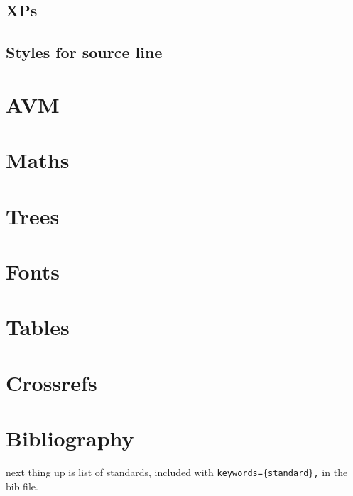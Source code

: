 \documentclass[output=book
  ,colorlinks
  ,showindex
    ,tblseight
  ]{langscibook}
\begin{document}
\subsection{XPs}




\subsection{Styles for source line}




\section{AVM}


\section{Maths}


\section{Trees}


\section{Fonts}



\section{Tables}\label{sec:tables}



\section{Crossrefs}


\section{Bibliography}


\printbibliography[notkeyword={techreport},notkeyword={website},title={References}]

next thing up is list of standards, included with \verb+keywords={standard},+ in the bib file.
\end{document}
